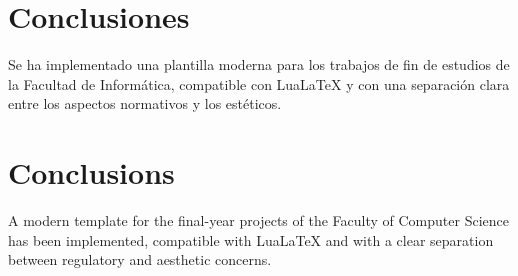 \chapter{Conclusiones}

Se ha implementado una plantilla moderna para los trabajos de
fin de estudios de la Facultad de Informática, compatible con
LuaLaTeX y con una separación clara entre los aspectos
normativos y los estéticos.

\chapter*{Conclusions}

A modern template for the final-year projects of the Faculty of
Computer Science has been implemented, compatible with LuaLaTeX
and with a clear separation between regulatory and aesthetic
concerns.
